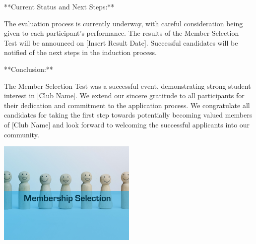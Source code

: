 \documentclass{article}
\begin{document}
**Current Status and Next Steps:**

The evaluation process is currently underway, with careful consideration being given to each participant's performance. The results of the Member Selection Test will be announced on [Insert Result Date]. Successful candidates will be notified of the next steps in the induction process.

**Conclusion:**

The Member Selection Test was a successful event, demonstrating strong student interest in [Club Name]. We extend our sincere gratitude to all participants for their dedication and commitment to the application process. We congratulate all candidates for taking the first step towards potentially becoming valued members of [Club Name] and look forward to welcoming the successful applicants into our community.

\vspace{1cm}
\begin{center}
    \includegraphics[width=0.5\textwidth]{photo_1.jpg}
\end{center}
\end{document}
